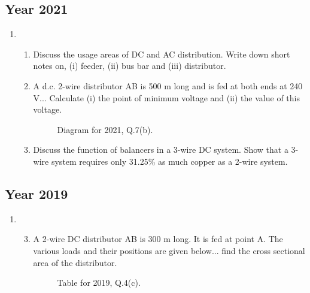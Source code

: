 \documentclass[12pt, a4paper]{article}
\begin{document}
	\subsection{Year 2021}
	\begin{enumerate}[label=\textbf{Q\arabic*.}, wide, labelindent=0pt, start=7]
		\item
		\begin{enumerate}[label=\textbf{(\alph*)}]
			\item Discuss the usage areas of DC and AC distribution. Write down short notes on, (i) feeder, (ii) bus bar and (iii) distributor.
			\item A d.c. 2-wire distributor AB is 500 m long and is fed at both ends at 240 V... Calculate (i) the point of minimum voltage and (ii) the value of this voltage.
			\begin{figure}[h!]
				\centering
				\caption{Diagram for 2021, Q.7(b).}
			\end{figure}
			\item Discuss the function of balancers in a 3-wire DC system. Show that a 3-wire system requires only 31.25\% as much copper as a 2-wire system.
		\end{enumerate}
	\end{enumerate}
	
	\subsection{Year 2019}
	\begin{enumerate}[label=\textbf{Q\arabic*.}, wide, labelindent=0pt, start=4]
		\item 
		\begin{enumerate}[label=\textbf{(\alph*)}]
			\setcounter{enumii}{2} %
			\item A 2-wire DC distributor AB is 300 m long. It is fed at point A. The various loads and their positions are given below... find the cross sectional area of the distributor.
			\begin{figure}[h!]
				\centering
				\caption{Table for 2019, Q.4(c).}
			\end{figure}
		\end{enumerate}
	\end{enumerate}
	
	
\end{document}
